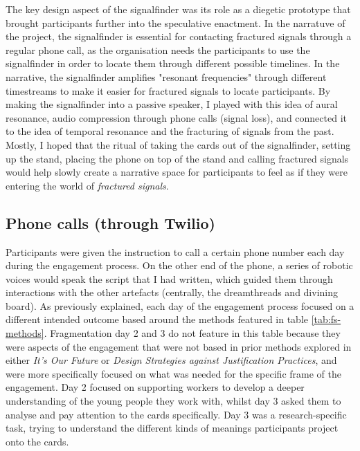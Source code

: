 The key design aspect of the signalfinder was its role as a diegetic prototype that brought participants further into the speculative enactment. In the narratuve of the project, the signalfinder is essential for contacting fractured signals through a regular phone call, as the organisation needs the participants to use the signalfinder in order to locate them through different possible timelines. In the narrative, the signalfinder amplifies "resonant frequencies" through different timestreams to make it easier for fractured signals to locate participants. By making the signalfinder into a passive speaker, I played with this idea of aural resonance, audio compression through phone calls (signal loss), and connected it to the idea of temporal resonance and the fracturing of signals from the past. Mostly, I hoped that the ritual of taking the cards out of the signalfinder, setting up the stand, placing the phone on top of the stand and calling fractured signals would help slowly create a narrative space for participants to feel as if they were entering the world of \textit{fractured signals}. 



\subsection{Phone calls (through Twilio)}

Participants were given the instruction to call a certain phone number each day during the engagement process. On the other end of the phone, a series of robotic voices would speak the script that I had written, which guided them through interactions with the other artefacts (centrally, the dreamthreads and divining board). As previously explained, each day of the engagement process focused on a different intended outcome based around the methods featured in table \ref{tab:fs-methods}. Fragmentation day 2 and 3 do not feature in this table because they were aspects of the engagement that were not based in prior methods explored in either \textit{It's Our Future} or \textit{Design Strategies against Justification Practices}, and were more specifically focused on what was needed for the specific frame of the engagement. Day 2 focused on supporting workers to develop a deeper understanding of the young people they work with, whilst day 3 asked them to analyse and pay attention to the cards specifically. Day 3 was a research-specific task, trying to understand the different kinds of meanings participants project onto the cards.  

